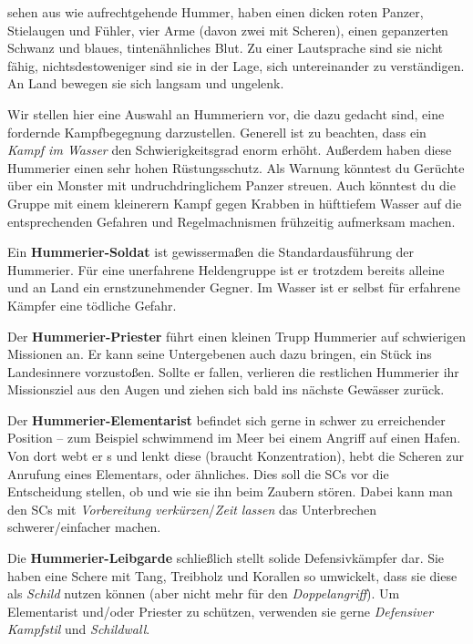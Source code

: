  sehen aus wie aufrechtgehende Hummer, haben einen dicken roten Panzer, Stielaugen und Fühler, vier Arme (davon zwei mit Scheren), einen gepanzerten Schwanz und blaues, tintenähnliches Blut.
Zu einer Lautsprache sind sie nicht fähig, nichtsdestoweniger sind sie in der Lage, sich untereinander zu verständigen. An Land bewegen sie sich langsam und ungelenk.

Wir stellen hier eine Auswahl an Hummeriern vor, die dazu gedacht sind, eine fordernde Kampfbegegnung darzustellen. Generell ist zu beachten, dass ein \textit{Kampf im Wasser} den Schwierigkeitsgrad enorm erhöht. Außerdem haben diese Hummerier einen sehr hohen Rüstungsschutz. Als Warnung könntest du Gerüchte über ein Monster mit undruchdringlichem Panzer streuen. Auch könntest du die Gruppe mit einem kleinerern Kampf gegen Krabben in hüfttiefem Wasser auf die entsprechenden Gefahren und Regelmachnismen frühzeitig aufmerksam machen.

Ein \textbf{Hummerier-Soldat} ist gewissermaßen die Standardausführung der Hummerier. Für eine unerfahrene Heldengruppe ist er trotzdem bereits alleine und an Land ein ernstzunehmender Gegner. Im Wasser ist er selbst für erfahrene Kämpfer eine tödliche Gefahr. 

Der \textbf{Hummerier-Priester} führt einen kleinen Trupp Hummerier auf schwierigen Missionen an. Er kann seine Untergebenen auch dazu bringen, ein Stück ins Landesinnere vorzustoßen. Sollte er fallen, verlieren die restlichen Hummerier ihr Missionsziel aus den Augen und ziehen sich bald ins nächste Gewässer zurück. 

Der \textbf{Hummerier-Elementarist} befindet sich gerne in schwer zu erreichender Position -- zum Beispiel schwimmend im Meer bei einem Angriff auf einen Hafen. Von dort webt er s und lenkt diese (braucht Konzentration), hebt die Scheren zur Anrufung eines Elementars, oder ähnliches. Dies soll die SCs vor die Entscheidung stellen, ob und wie sie ihn beim Zaubern stören. Dabei kann man den SCs mit \textit{Vorbereitung verkürzen}/\textit{Zeit lassen} das Unterbrechen schwerer/einfacher machen. 

Die \textbf{Hummerier-Leibgarde} schließlich stellt solide Defensivkämpfer dar. Sie haben eine Schere mit Tang, Treibholz und Korallen so umwickelt, dass sie diese als \textit{Schild} nutzen können (aber nicht mehr für den \textit{Doppelangriff}). Um Elementarist und/oder Priester zu schützen, verwenden sie gerne \textit{Defensiver Kampfstil} und \textit{Schildwall}.

\neuespalte


\kreaturhummeriersoldat
\kreaturhummerierleibgarde
\kreaturhummerierelementarist
\kreaturhummerierpriesterkrustentiere
\spaltenende